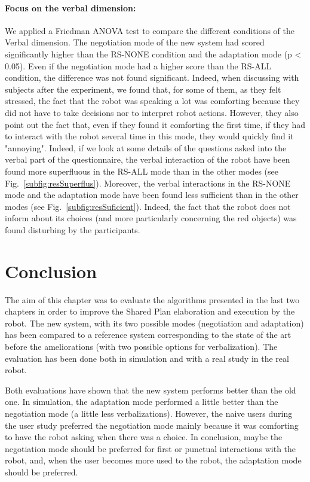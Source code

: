 \documentclass[english,a4paper,11pt,twoside]{StyleThese}
\begin{document}
\paragraph{Focus on the verbal dimension:}
We applied a Friedman ANOVA test to compare the different conditions of the Verbal dimension. The negotiation mode of the new system had scored significantly higher than the RS-NONE condition and the adaptation mode (p < 0.05). Even if the negotiation mode had a higher score than the RS-ALL condition, the difference was not found significant. Indeed, when discussing with subjects after the experiment, we found that, for some of them, as they felt stressed, the fact that the robot was speaking a lot was comforting because they did not have to take decisions nor to interpret robot actions. However, they also point out the fact that, even if they found it comforting the first time, if they had to interact with the robot several time in this mode, they would quickly find it "annoying". Indeed, if we look at some details of the questions asked into the verbal part of the questionnaire, the verbal interaction of the robot have been found more superfluous in the RS-ALL mode than in the other modes (see Fig.~\ref{subfig:resSuperflus}). Moreover, the verbal interactions in the RS-NONE mode and the adaptation mode have been found less sufficient than in the other modes (see Fig.~\ref{subfig:resSuficient}). Indeed, the fact that the robot does not inform about its choices (and more particularly concerning the red objects) was found disturbing by the participants.



\newpage
\section{Conclusion}

The aim of this chapter was to evaluate the algorithms presented in the last two chapters in order to improve the Shared Plan elaboration and execution by the robot. The new system, with its two possible modes (negotiation and adaptation) has been compared to a reference system corresponding to the state of the art before the ameliorations (with two possible options for verbalization). The evaluation has been done both in simulation and with a real study in the real robot. 

Both evaluations have shown that the new system performs better than the old one. In simulation, the adaptation mode performed a little better than the negotiation mode (a little less verbalizations). However, the naive users during the user study preferred the negotiation mode mainly because it was comforting to have the robot asking when there was a choice. In conclusion, maybe the negotiation mode should be preferred for first or punctual interactions with the robot, and, when the user becomes more used to the robot, the adaptation mode should be preferred.
\end{document}

